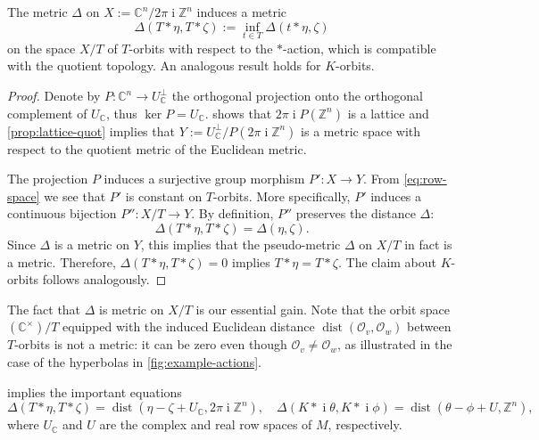 \documentclass[a4paper,USenglish,cleveref,numberwithinsect]{lipics-v2021}
\DeclareMathOperator{\ii}{i}
\DeclareMathOperator{\dist}{dist}
\newcommand{\CC}{\mathbb{C}}
\newcommand{\ZZ}{\mathbb{Z}}
\newcommand{\OO}{\ensuremath{\mathcal{O}}}
\numberwithin{equation}{section}
\begin{document}
\begin{proposition}\label{prop:delta-is-a-metric}
The metric $\Delta$ on $X:=\CC^n/2\pi\ii\ZZ^n$ induces a metric
$$
 \Delta(T\ast \eta, T\ast \zeta) := \inf_{t\in T} \Delta( t\ast \eta,\zeta)
$$
on the space $X/T$ of $T$-orbits with respect to the $\ast$-action,
which is compatible with the quotient topology.
An analogous result holds for $K$-orbits.
\end{proposition}

\begin{proof}

Denote by $P:\CC^n\rightarrow U_\CC^\perp$ the orthogonal projection onto the orthogonal complement of $U_\CC$,
thus $\ker P = U_\CC$.
 shows that $2\pi\ii P(\ZZ^n)$ is a lattice
and \cref{prop:lattice-quot} implies that
$Y := U_\CC^\perp/P(2\pi\ii\ZZ^n)$
is a metric space with respect to the quotient metric of the Euclidean metric.

The projection $P$ induces a surjective group morphism
$P'\colon X \to Y$.
From \cref{eq:row-space} we see that $P'$
is constant on $T$-orbits. More specifically,
$P'$ induces a continuous bijection
$P''\colon X/T \to Y$.
By definition, $P''$ preserves the distance $\Delta$:
$$
 \Delta(T\ast \eta, T\ast \zeta) = \Delta(\eta, \zeta) .
$$
Since $\Delta$ is a metric on $Y$, this implies that
the pseudo-metric $\Delta$ on $X/T$ in fact is a metric.
Therefore, $\Delta(T\ast\eta,T\ast\zeta)=0$ implies $T\ast\eta=T\ast\zeta$.
The claim about $K$-orbits follows analogously.
\end{proof}

\begin{remark}
The fact that $\Delta$ is metric on $X/T$ is our essential gain.
Note that the orbit space $(\CC^\times)/T$ equipped with the induced
Euclidean distance $\dist(\OO_v,\OO_w)$ between $T$-orbits
is not a metric: it can be zero even though $\OO_v\neq\OO_w$,
as illustrated in the case of the hyperbolas in \cref{fig:example-actions}.
\end{remark}

 implies the important equations
\begin{equation}\label{eq:Delta=dist}
 \Delta(T\ast\eta,T\ast \zeta) = \dist( \eta-\zeta + U_\CC , 2\pi\ii\ZZ^n) ,\quad
 \Delta(K\ast \ii\theta, K\ast \ii\phi) = \dist(\theta-\phi + U, \ZZ^n) ,
\end{equation}
where $U_\CC$ and $U$ are the complex and real row spaces  of $M$,
respectively.
\end{document}
